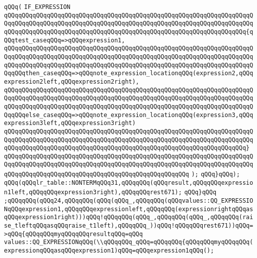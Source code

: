 \verb|qQQq(|\newline
\verb|IF_EXPRESSION|\newline
\verb|qQQqqQQqqQQqqQQqqQQqqQQqqQQqqQQqqQQqqQQqqQQqqQQqqQQqqQQqqQQqqQQqqQQqqQQqqQQqqQQqqQQqqQQqqQQqqQQqqQQqqQQqqQQqqQQqqQQqqQQqqQQqqQQqqQQqqQQqqQQqqQQqqQQqqQQqqQQqqQQqqQQqqQQqqQQqqQQqqQQqqQQqqQQqqQQqqQQqqQQqqQQqqQQq{qQQqtest_caseqQQq=>qQQqexpression1,|\newline
\verb|qQQqqQQqqQQqqQQqqQQqqQQqqQQqqQQqqQQqqQQqqQQqqQQqqQQqqQQqqQQqqQQqqQQqqQQqqQQqqQQqqQQqqQQqqQQqqQQqqQQqqQQqqQQqqQQqqQQqqQQqqQQqqQQqqQQqqQQqqQQqqQQqqQQqqQQqqQQqqQQqqQQqqQQqqQQqqQQqqQQqqQQqqQQqqQQqqQQqqQQqqQQqqQQqqQQqqQQqthen_caseqQQq=>qQQqnote_expression_locationqQQq(expression2,qQQqexpression2left,qQQqexpression2right),|\newline
\verb|qQQqqQQqqQQqqQQqqQQqqQQqqQQqqQQqqQQqqQQqqQQqqQQqqQQqqQQqqQQqqQQqqQQqqQQqqQQqqQQqqQQqqQQqqQQqqQQqqQQqqQQqqQQqqQQqqQQqqQQqqQQqqQQqqQQqqQQqqQQqqQQqqQQqqQQqqQQqqQQqqQQqqQQqqQQqqQQqqQQqqQQqqQQqqQQqqQQqqQQqqQQqqQQqqQQqqQQqelse_caseqQQq=>qQQqnote_expression_locationqQQq(expression3,qQQqexpression3left,qQQqexpression3right)|\newline
\verb|qQQqqQQqqQQqqQQqqQQqqQQqqQQqqQQqqQQqqQQqqQQqqQQqqQQqqQQqqQQqqQQqqQQqqQQqqQQqqQQqqQQqqQQqqQQqqQQqqQQqqQQqqQQqqQQqqQQqqQQqqQQqqQQqqQQqqQQqqQQqqQQqqQQqqQQqqQQqqQQqqQQqqQQqqQQqqQQqqQQqqQQqqQQqqQQqqQQqqQQqqQQqqQQq}|\newline
\verb|qQQqqQQqqQQqqQQqqQQqqQQqqQQqqQQqqQQqqQQqqQQqqQQqqQQqqQQqqQQqqQQqqQQqqQQqqQQqqQQqqQQqqQQqqQQqqQQqqQQqqQQqqQQqqQQqqQQqqQQqqQQqqQQqqQQqqQQqqQQqqQQqqQQqqQQqqQQqqQQqqQQqqQQqqQQqqQQqqQQqqQQqqQQqqQQq|\newline
\verb|);|\newline
\verb|qQQq}qQQq);|\newline
\verb|qQQq(qQQqlr_table::NONTERMqQQq31,qQQqqQQq(qQQqresult,qQQqqQQqexpression1left,qQQqqQQqexpression3right),qQQqqQQqrest671);|\newline
\verb|qQQq}qQQq|\newline
\verb|;qQQqqQQq(qQQq24,qQQqqQQq(qQQq(qQQq_,qQQqqQQq(qQQqvalues::QQ_EXPRESSIONqQQqexpression1,qQQqqQQqexpressionleft,qQQqqQQq(expressionrightqQQqasqQQqexpression1right)))qQQq!qQQqqQQq(qQQq_,qQQqqQQq(qQQq_,qQQqqQQq(raise_tleftqQQqasqQQqraise_t1left),qQQqqQQq_))qQQq!qQQqqQQqrest671))qQQq=>qQQq{qQQqqQQqmyqQQqqQQqresultqQQq=qQQq|\newline
\verb|values::QQ_EXPRESSIONqQQq(\\qQQqqQQq_qQQq=qQQqqQQq{qQQqqQQqmyqQQqqQQq(expressionqQQqasqQQqexpression1)qQQq=qQQqexpression1qQQq();|\newline
